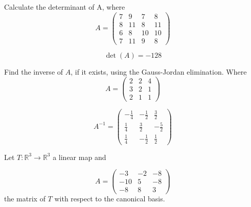 \begin{questions}

\question Calculate the determinant of A, where
$$
A=\left(\begin{array}{rrrr}
7 & 9 & 7 & 8 \\
8 & 11 & 8 & 11 \\
6 & 8 & 10 & 10 \\
7 & 11 & 9 & 8
\end{array}\right)
$$

\begin{solution}
$$\det(A)=-128$$
\end{solution}

\question Find the inverse of $A$, if it exists, using the Gauss-Jordan elimination. Where
$$
A=\left(\begin{array}{rrr}
2 & 2 & 4 \\
3 & 2 & 1 \\
2 & 1 & 1
\end{array}\right)
$$

\begin{solution}
$$A^{-1}=\left(\begin{array}{rrr}
-\frac{1}{4} & -\frac{1}{2} & \frac{3}{2} \\
\frac{1}{4} & \frac{3}{2} & -\frac{5}{2} \\
\frac{1}{4} & -\frac{1}{2} & \frac{1}{2}
\end{array}\right)$$
\end{solution}

\question Let $T:\mathbb{R}^3\rightarrow\mathbb{R}^3$  a linear map and
 
$$
A=\left(\begin{array}{rrr}
-3 & -2 & -8 \\
-10 & 5 & -8 \\
-8 & 8 & 3
\end{array}\right)
$$
the matrix of $T$ with respect to the canonical basis.
\end{questions}
